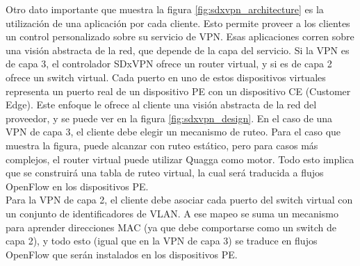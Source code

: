 Otro dato importante que muestra la figura \ref{fig:sdxvpn_architecture} es la utilización de una aplicación por cada cliente. Esto permite proveer a los clientes un control personalizado sobre su servicio de VPN. Esas aplicaciones corren sobre una visión abstracta de la red, que depende de la capa del servicio. Si la VPN es de capa 3, el controlador SDxVPN ofrece un router virtual, y si es de capa 2 ofrece un switch virtual. Cada puerto en uno de estos dispositivos virtuales representa un puerto real de un dispositivo PE con un dispositivo CE (Customer Edge). Este enfoque le ofrece al cliente una visión abstracta de la red del proveedor, y se puede ver en la figura \ref{fig:sdxvpn_design}. En el caso de una VPN de capa 3, el cliente debe elegir un mecanismo de ruteo. Para el caso que muestra la figura, puede alcanzar con ruteo estático, pero para casos más complejos, el router virtual puede utilizar Quagga como motor. Todo esto implica que se construirá una tabla de ruteo virtual, la cual será traducida a flujos OpenFlow en los dispositivos PE. \\
Para la VPN de capa 2, el cliente debe asociar cada puerto del switch virtual con un conjunto de identificadores de VLAN. A ese mapeo se suma un mecanismo para aprender direcciones MAC (ya que debe comportarse como un switch de capa 2), y todo esto (igual que en la VPN de capa 3) se traduce en flujos OpenFlow que serán instalados en los dispositivos PE.

